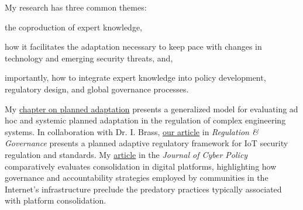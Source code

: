\documentclass[11pt]{letter}
\begin{document}
\begin{letter}
My research has three common themes: 
  \begin{inparaenum}
    \item the coproduction of expert knowledge, 
    \item how it facilitates the adaptation necessary to keep pace with changes in technology and emerging security threats, and, 
    \item importantly, how to integrate expert knowledge into policy development, regulatory design, and global governance processes. 
  \end{inparaenum}
%
My %
  \href{https://link.springer.com/chapter/10.1007/978-3-030-05252-2_13}{chapter on planned adaptation} %
presents a generalized model for evaluating ad hoc and systemic planned adaptation in the regulation of complex engineering systems.
%
%
In collaboration with Dr. I. Brass, %
  \href{https://link.springer.com/chapter/10.1007/978-3-030-05252-2_13}{our article} %
in \emph{Regulation \& Governance} presents a planned adaptive regulatory framework for IoT security regulation and standards.
%
%
%
My %
  \href{https://www.tandfonline.com/doi/full/10.1080/23738871.2020.1754443}{article} 
in the \emph{Journal of Cyber Policy} comparatively evaluates consolidation in digital platforms, highlighting how governance and accountability strategies employed by communities in the Internet's infrastructure preclude the predatory practices typically associated with platform consolidation. 
%
%

\end{letter}
\end{document}
